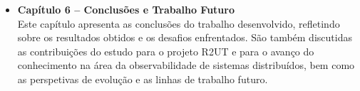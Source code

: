 \begin{itemize}
    \item \textbf{Capítulo 6 – Conclusões e Trabalho Futuro} \\
    Este capítulo apresenta as conclusões do trabalho desenvolvido, refletindo sobre os resultados obtidos e os desafios enfrentados. São também discutidas as contribuições do estudo para o projeto R2UT e para o avanço do conhecimento na área da observabilidade de sistemas distribuídos, bem como as perspetivas de evolução e as linhas de trabalho futuro.
    
\end{itemize}
